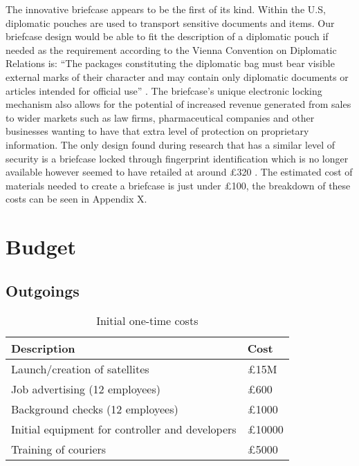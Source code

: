 The innovative briefcase appears to be the first of its kind. Within the U.S, diplomatic pouches are used to transport sensitive documents and items. Our briefcase design would be able to fit the description of a diplomatic pouch if needed as the requirement according to the Vienna Convention on Diplomatic Relations is: “The packages constituting the diplomatic bag must bear visible external marks of their character and may contain only diplomatic documents or articles intended for official use” \cite{viennaConvention}. The briefcase’s unique electronic locking mechanism also allows for the potential of increased revenue generated from sales to wider markets such as law firms, pharmaceutical companies and other businesses wanting to have that extra level of protection on proprietary information. The only design found during research that has a similar level of security is a briefcase locked through fingerprint identification which is no longer available however seemed to have retailed at around £320 \cite{fingerprintBriefcase} \cite{biometricBriefcase}. The estimated cost of materials needed to create a briefcase is just under £100, the breakdown of these costs can be seen in Appendix X. 

\section{Budget}

\subsection{Outgoings}

\begin{table}[H]
    \centering
    \begin{tabular}{|p{}|p{}|}
        \hline
        \textbf{Description} & \textbf{Cost} \\
        \hline
        Launch/creation of satellites & £15M \\
        \hline
        Job advertising (12 employees) & £600\\
        \hline
        Background checks (12 employees) & £1000 \\
        \hline
        Initial equipment for controller and developers & £10000\\
        \hline
        Training of couriers & £5000\\
        \hline
    \end{tabular}
    \caption{Initial one-time costs}
    \label{tab:initialCosts}
\end{table}

